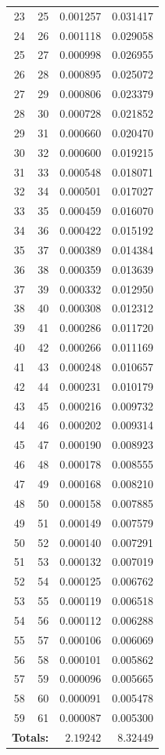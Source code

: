\documentclass[12pt,a4paper]{article}
\begin{document}
\begin{longtable}{rrrr}
23 & 25 & 0.001257 & 0.031417 \\
24 & 26 & 0.001118 & 0.029058 \\
25 & 27 & 0.000998 & 0.026955 \\
26 & 28 & 0.000895 & 0.025072 \\
27 & 29 & 0.000806 & 0.023379 \\
28 & 30 & 0.000728 & 0.021852 \\
29 & 31 & 0.000660 & 0.020470 \\
30 & 32 & 0.000600 & 0.019215 \\
31 & 33 & 0.000548 & 0.018071 \\
32 & 34 & 0.000501 & 0.017027 \\
33 & 35 & 0.000459 & 0.016070 \\
34 & 36 & 0.000422 & 0.015192 \\
35 & 37 & 0.000389 & 0.014384 \\
36 & 38 & 0.000359 & 0.013639 \\
37 & 39 & 0.000332 & 0.012950 \\
38 & 40 & 0.000308 & 0.012312 \\
39 & 41 & 0.000286 & 0.011720 \\
40 & 42 & 0.000266 & 0.011169 \\
41 & 43 & 0.000248 & 0.010657 \\
42 & 44 & 0.000231 & 0.010179 \\
43 & 45 & 0.000216 & 0.009732 \\
44 & 46 & 0.000202 & 0.009314 \\
45 & 47 & 0.000190 & 0.008923 \\
46 & 48 & 0.000178 & 0.008555 \\
47 & 49 & 0.000168 & 0.008210 \\
48 & 50 & 0.000158 & 0.007885 \\
49 & 51 & 0.000149 & 0.007579 \\
50 & 52 & 0.000140 & 0.007291 \\
51 & 53 & 0.000132 & 0.007019 \\
52 & 54 & 0.000125 & 0.006762 \\
53 & 55 & 0.000119 & 0.006518 \\
54 & 56 & 0.000112 & 0.006288 \\
55 & 57 & 0.000106 & 0.006069 \\
56 & 58 & 0.000101 & 0.005862 \\
57 & 59 & 0.000096 & 0.005665 \\
58 & 60 & 0.000091 & 0.005478 \\
59 & 61 & 0.000087 & 0.005300 \\
\midrule
\multicolumn{2}{r}{\textbf{Totals:}} & $\mathbf{2.19242}$ & $\mathbf{8.32449}$ \\
\end{longtable}
\end{document}
